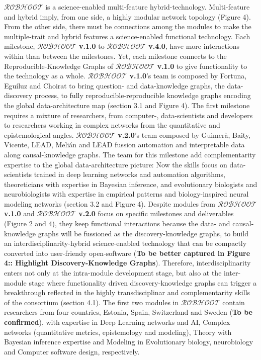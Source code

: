 \documentclass[11pt, a4paper]{article} %
\begin{document}
  {\bf $\mathcal{ROBHOOT}$} is a science-enabled multi-feature
  hybrid-technology. Multi-feature and hybrid imply, from one side, a
  highly modular network topology (Figure 4). From the other side,
  there must be connections among the modules to make the
  multiple-trait and hybrid features a science-enabled functional
  technology. Each milestone, {\bf $\mathcal{ROBHOOT}$ v.1.0} to {\bf
    $\mathcal{ROBHOOT}$ v.4.0}, have more interactions within than
  between the milestones. Yet, each milestone connects to the
  Reproducible-Knowledge Graphs of {\bf $\mathcal{ROBHOOT}$ v.1.0} to
  give functionality to the technology as a whole. {\bf
    $\mathcal{ROBHOOT}$ v.1.0}'s team is composed by Fortuna,
  Egu\'iluz and Choirat to bring question- and data-knowledge graphs,
  the data-discovery process, to fully reproducible-reproducible
  knowledge graphs encoding the global data-architecture map (section
  3.1 and Figure 4). The first milestone requires a mixture of
  researchers, from computer-, data-scientists and developers to
  researchers working in complex networks from the quantitative and
  epistemological angles. {\bf $\mathcal{ROBHOOT}$ v.2.0}'s team
  composed by Guimer\`a, Baity, Vicente, LEAD, Meli\'an and LEAD
  fussion automation and interpretable data along causal-knowledge
  graphs. The team for this milestone add complementarity expertise to
  the global data-architecture picture: Now the skills focus on
  data-scientists trained in deep learning networks and automation
  algorithms, theoreticians with expertise in Bayesian inference, and
  evolutionary biologists and neurobiologists with expertise in
  empirical patterns and biology-inspired neural modeling networks
  (section 3.2 and Figure 4). Despite modules from {\bf
    $\mathcal{ROBHOOT}$ v.1.0} and {\bf $\mathcal{ROBHOOT}$ v.2.0}
  focus on specific milestones and deliverables (Figure 2 and 4), they
  keep functional interactions because the data- and causal-knowledge
  graphs will be fussioned as the discovery-knowledge graphs, to build
  an interdisciplinarity-hybrid science-enabled technology that can be
  compactly converted into user-friendy open-software ({\bf To be
    better captured in Figure 4:: Highlight Discovery-Knowledge
    Graphs}). Therefore, interdisciplinarity enters not only at the
  intra-module development stage, but also at the inter-module stage
  where functionality driven discovery-knowledge graphs can trigger a
  breakthrough reflected in the highly transdisciplinar and
  complementarity skills of the consortium (section 4.1). The first
  two modules in {\bf $\mathcal{ROBHOOT}$} contain researchers from
  four countries, Estonia, Spain, Switzerland and Sweden ({\bf To be
    confirmed}), with expertise in Deep Learning networks and AI,
  Complex networks (quantitative metrics, epistemology and modeling),
  Theory with Bayesian inference expertise and Modeling in
  Evolutionary biology, neurobiology and Computer software design,
  respectively.
\end{document}
